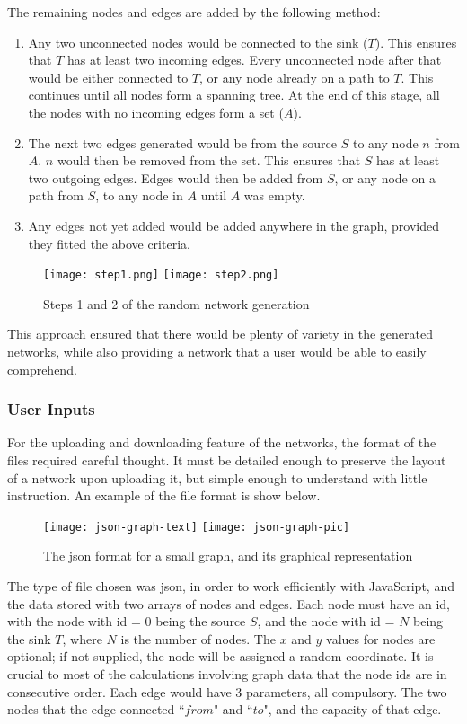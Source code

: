 \documentclass{l4proj}
\begin{document}
The remaining nodes and edges are added by the following method:
\begin{enumerate}[noitemsep]
    \item Any two unconnected nodes would be connected to the sink ($T$). This ensures that $T$ has at least two incoming edges. Every unconnected node after that would be either connected to $T$, or any node already on a path to $T$. This continues until all nodes form a spanning tree. At the end of this stage, all the nodes with no incoming edges form a set ($A$).
    \item The next two edges generated would be from the source $S$ to any node $n$ from $A$. $n$ would then be removed from the set. This ensures that $S$ has at least two outgoing edges. Edges would then be added from $S$, or any node on a path from $S$, to any node in $A$ until $A$ was empty.
    \item Any edges not yet added would be added anywhere in the graph, provided they fitted the above criteria.
\end{enumerate}

\begin{figure}[h]
\texttt{[image: step1.png]}
\texttt{[image: step2.png]}
\caption{Steps 1 and 2 of the random network generation}
\end{figure}

This approach ensured that there would be plenty of variety in the generated networks, while also providing a network that a user would be able to easily comprehend.
\subsubsection{User Inputs} \label{drawing}
For the uploading and downloading feature of the networks, the format of the files required careful thought. It must be detailed enough to preserve the layout of a network upon uploading it, but simple enough to understand with little instruction. An example of the file format is show below.

\begin{figure}[h]
    \centering
    \texttt{[image: json-graph-text]}
    \texttt{[image: json-graph-pic]}
    \caption{\label{fig:json-graph}The json format for a small graph, and its graphical representation}
\end{figure}

The type of file chosen was json, in order to work efficiently with JavaScript, and the data stored with two arrays of nodes and edges. Each node must have an id, with the node with id = 0 being the source $S$, and the node with id = $N$ being the sink $T$, where $N$ is the number of nodes. The $x$ and $y$ values for nodes are optional; if not supplied, the node will be assigned a random coordinate. It is crucial to most of the calculations involving graph data that the node ids are in consecutive order. Each edge would have 3 parameters, all compulsory. The two nodes that the edge connected ``$from$" and ``$to$", and the capacity of that edge.
\end{document}
